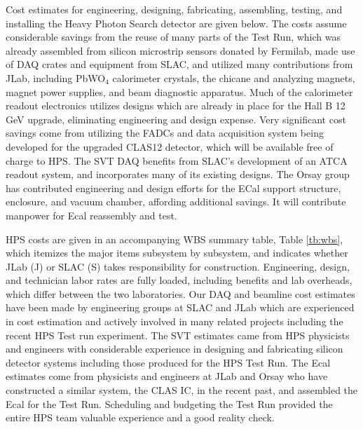 \label{sec:schcost}

Cost estimates for engineering, designing, fabricating, assembling, testing, and installing the Heavy Photon Search detector 
are given below. The costs assume considerable savings from the reuse of many parts of the Test Run, which was already assembled 
from silicon microstrip sensors donated by Fermilab, made use of DAQ crates and equipment from SLAC,
and utilized many contributions from JLab, including PbWO$_4$ calorimeter crystals, the chicane and analyzing magnets, magnet power supplies,
and beam diagnostic apparatus. Much of the calorimeter readout electronics utilizes designs which are already in place for the Hall
B 12 GeV upgrade, eliminating engineering and design expense. Very significant cost savings come from utilizing the FADCs and data acquisition 
system being developed for the upgraded CLAS12 detector, which will be available free of charge to HPS. The SVT DAQ benefits from SLAC's 
development of an ATCA readout system, and incorporates many of its existing designs.  The Orsay group has
contributed engineering and design efforts for the ECal support structure, enclosure, and vacuum chamber, affording additional savings. It will
contribute manpower for Ecal reassembly and test.  

HPS costs are given in an accompanying WBS summary table, Table \ref{tb:wbs}, which itemizes the major items subsystem by subsystem, and 
indicates whether JLab (J) or SLAC (S) takes responsibility for construction. Engineering, design, and technician labor rates are fully loaded, 
including benefits and lab overheads, which differ between the two laboratories. Our 
DAQ and beamline cost estimates have been made by engineering groups at SLAC and JLab which are experienced in cost estimation and 
actively involved in many related projects including the recent HPS Test run experiment. The SVT estimates came from HPS physicists and engineers  with
considerable experience in designing and fabricating silicon detector systems including those produced for the HPS Test Run. 
The Ecal estimates come from physicists and engineers at 
JLab and Orsay who have constructed a similar system, the CLAS IC, in the recent past, and assembled the Ecal for the Test Run.
Scheduling and budgeting the Test Run provided the entire HPS team valuable experience and a good reality check. 

